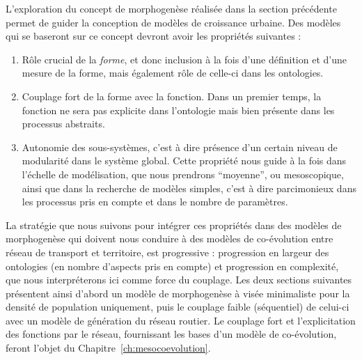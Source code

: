 




\newpage


L'exploration du concept de morphogenèse réalisée dans la section précédente permet de guider la conception de modèles de croissance urbaine. Des modèles qui se baseront sur ce concept devront avoir les propriétés suivantes :
\begin{enumerate}
	\item Rôle crucial de la \emph{forme}, et donc inclusion à la fois d'une définition et d'une mesure de la forme, mais également rôle de celle-ci dans les ontologies.
	\item Couplage fort de la forme avec la fonction. Dans un premier temps, la fonction ne sera pas explicite dans l'ontologie mais bien présente dans les processus abstraits.
	\item Autonomie des sous-systèmes, c'est à dire présence d'un certain niveau de modularité dans le système global. Cette propriété nous guide à la fois dans l'échelle de modélisation, que nous prendrons ``moyenne'', ou mesoscopique, ainsi que dans la recherche de modèles simples, c'est à dire parcimonieux dans les processus pris en compte et dans le nombre de paramètres.
\end{enumerate}

La stratégie que nous suivons pour intégrer ces propriétés dans des modèles de morphogenèse qui doivent nous conduire à des modèles de co-évolution entre réseau de transport et territoire, est progressive : progression en largeur des ontologies (en nombre d'aspects pris en compte) et progression en complexité, que nous interpréterons ici comme force du couplage. Les deux sections suivantes présentent ainsi d'abord un modèle de morphogenèse à visée minimaliste pour la densité de population uniquement, puis le couplage faible (séquentiel) de celui-ci avec un modèle de génération du réseau routier. Le couplage fort et l'explicitation des fonctions par le réseau, fournissant les bases d'un modèle de co-évolution, feront l'objet du Chapitre~\ref{ch:mesocoevolution}.




